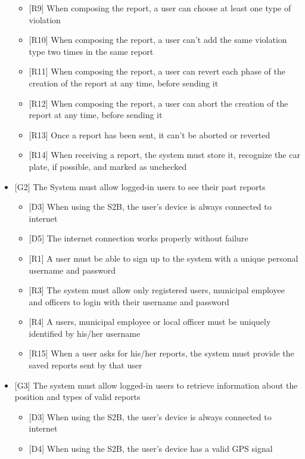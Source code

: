 \begin{itemize}
\begin{itemize}
								\item {[R9]} When composing the report, a user can choose at least one type of violation
								\item {[R10]} When composing the report, a user can't add the same violation type two times in the same report
								\item {[R11]} When composing the report, a user can revert each phase of the creation of the report at any time, before sending it
								\item {[R12]} When composing the report, a user can abort the creation of the report at any time, before sending it
								\item {[R13]} Once a report has been sent, it can't be aborted or reverted
								\item {[R14]} When receiving a report, the system must store it, recognize the car plate, if possible, and marked as unchecked
							\end{itemize}
						\clearpage
						\item {[G2]} The System must allow logged-in users to see their past reports
							\begin{itemize}
								\item {[D3]} When using the S2B, the user's device is always connected to internet
								\item {[D5]} The internet connection works properly without failure
								\item {[R1]} A user must be able to sign up to the system with a unique personal username and password
								\item {[R3]} The system must allow only registered users, municipal employee and officers to login with their username and password
								\item {[R4]} A users, municipal employee or local officer must be uniquely identified by his/her username
								\item {[R15]} When a user asks for his/her reports, the system must provide the saved reports sent by that user
							\end{itemize}
						\item {[G3]} The system must allow logged-in users to retrieve information about the position and types of valid reports
							\begin{itemize}
								\item {[D3]} When using the S2B, the user's device is always connected to internet
								\item {[D4]} When using the S2B, the user's device has a valid GPS signal

\end{itemize}
\end{itemize}
